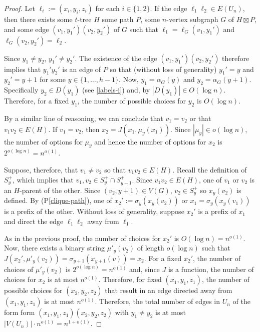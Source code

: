 \documentclass{patmorin}
\newcommand{\pref}[1]{(P\ref{#1})}
\begin{document}
\begin{proof}
    Let $\ell_i:=(x_i,y_i,z_i)$ for each $i\in\{1,2\}$.  If the edge $\ell_1\ell_2\in E(U_n)$, then there exists some $t$-tree $H$ some path $P$, some $n$-vertex subgraph $G$ of $H\boxtimes P$, and some edge $(v_1,y_1')(v_2,y_2')$ of $G$ such that $\ell_1=\ell_G(v_1,y_1')$ and $\ell_G(v_2,y_2')=\ell_2$.

    Since $y_1\neq y_2$, $y_1'\neq y_2'$.
    The existence of the edge $(v_1,y_1')(v_2,y_2')$ therefore implies that $y_1'y_2'$ is an edge of $P$ so that (without loss of generality) $y_1'=y$ and $y_2'=y+1$ for some $y\in\{1,\ldots,h-1\}$.  Now, $y_1=\alpha_G(y)$ and $y_2=\alpha_G(y+1)$.  Specifically $y_2\in D(y_1)$ (see \cref{labels-i}) and, by $|D(y_1)|\in O(\log n)$.  Therefore, for a fixed $y_1$, the number of possible choices for $y_2$ is $O(\log n)$.

    By a similar line of reasoning, we can conclude that $v_1=v_2$ or that $v_1v_2\in E(H)$.  If $v_1=v_2$, then $x_2=J(x_1,\mu_y(x_1))$. Since $|\mu_y|\in o(\log n)$, the number of options for $\mu_y$ and hence the number of options for $x_2$ is $2^{o(\log n)}=n^{o(1)}$.

    Suppose, therefore, that $v_1\neq v_2$ so that $v_1v_2\in E(H)$.  Recall the definition of $S^+_y$, which implies that $v_1,v_2\in S^+_y\cap S^+_{y+1}$.  Since $v_1v_2\in E(H)$, one of $v_1$ or $v_2$ is an $H$-parent of the other. Since $(v_2,y+1)\in V(G)$, $v_2\in S^+_y$ so $x_y(v_2)$ is defined. By \pref{clique-path}, one of $x_2':=\sigma_y(x_y(v_2))$ or $x_1=\sigma_y(x_y(v_1))$ is a prefix of the other.  Without loss of generality, suppose $x_2'$ is a prefix of $x_1$ and direct the edge $\ell_1\ell_2$ away from $\ell_1$.

    As in the previous proof, the number of choices for $x_2'$ is $O(\log n)=n^{o(1)}$.
    Now, there exists a binary string $\mu'_y(v_2)$ of length $o(\log n)$ such that $J(x_2',\mu'_y(v_2))=\sigma_{y+1}(x_{y+1}(v))=x_2$.  For a fixed $x_2'$, the number of choices of $\mu'_y(v_2)$ is $2^{o(\log n)}=n^{o(1)}$ and, since $J$ is a function, the number of choices for $x_2$ is at most $n^{o(1)}$.  Therefore, for fixed $(x_1,y_1,z_1)$, the number of possible choices for $(x_2,y_2,z_2)$ that result in an edge directed away from $(x_1,y_1,z_1)$ is at most $n^{o(1)}$.  Therefore, the total number of edges in $U_n$ of the form form $(x_1,y_1,z_1)(x_2,y_2,z_2)$ with $y_1\neq y_2$ is at most $|V(U_n)|\cdot n^{o(1)} = n^{1+o(1)}$.
\end{proof}
\end{document}
